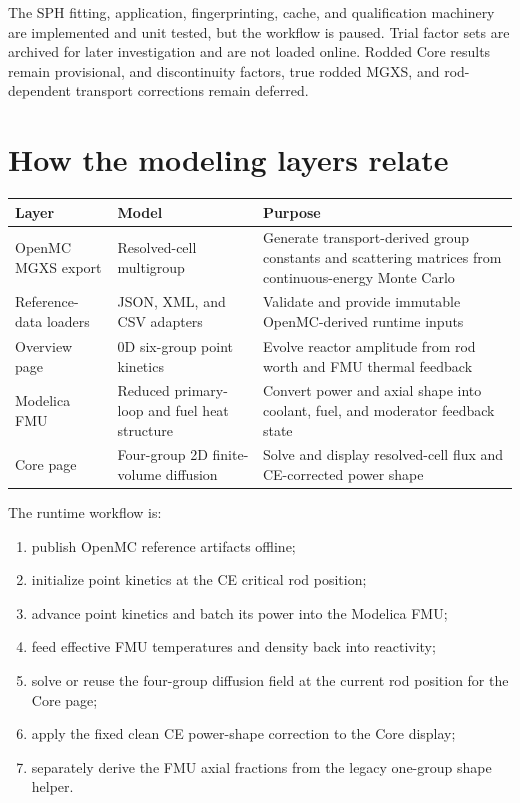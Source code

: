 \documentclass[11pt]{article}
\begin{document}
The SPH fitting, application, fingerprinting, cache, and qualification
machinery are implemented and unit tested, but the workflow is paused.  Trial
factor sets are archived for later investigation and are not loaded online.
Rodded Core results remain provisional, and discontinuity factors, true
rodded MGXS, and rod-dependent transport corrections remain deferred.

\section{How the modeling layers relate}

\begin{center}
\small
\begin{tabular}{p{3.2cm}p{4.0cm}p{5.3cm}}
\toprule
Layer & Model & Purpose \\
\midrule
OpenMC MGXS export & Resolved-cell multigroup & Generate transport-derived group constants and scattering matrices from continuous-energy Monte Carlo \\
\rule{0pt}{13pt}%
Reference-data loaders & JSON, XML, and CSV adapters & Validate and provide immutable OpenMC-derived runtime inputs \\
Overview page & 0D six-group point kinetics & Evolve reactor amplitude from rod worth and FMU thermal feedback \\
Modelica FMU & Reduced primary-loop and fuel heat structure & Convert power and axial shape into coolant, fuel, and moderator feedback state \\
Core page & Four-group 2D finite-volume diffusion & Solve and display resolved-cell flux and CE-corrected power shape \\
\bottomrule
\end{tabular}
\end{center}

The runtime workflow is:
\begin{enumerate}
  \item publish OpenMC reference artifacts offline;
  \item initialize point kinetics at the CE critical rod position;
  \item advance point kinetics and batch its power into the Modelica FMU;
  \item feed effective FMU temperatures and density back into reactivity;
  \item solve or reuse the four-group diffusion field at the current rod
        position for the Core page;
  \item apply the fixed clean CE power-shape correction to the Core display;
  \item separately derive the FMU axial fractions from the legacy one-group
        shape helper.
\end{enumerate}
\end{document}
